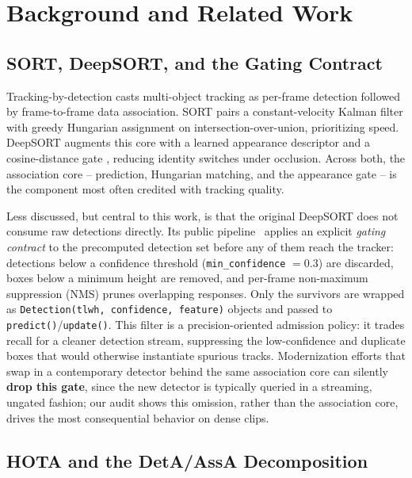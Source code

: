 \section{Background and Related Work}
\label{sec:related}

\subsection{SORT, DeepSORT, and the Gating Contract}

Tracking-by-detection casts multi-object tracking as per-frame detection followed by frame-to-frame data association. SORT \cite{bewley2016sort} pairs a constant-velocity Kalman filter with greedy Hungarian assignment on intersection-over-union, prioritizing speed. DeepSORT \cite{wojke2017deepsort} augments this core with a learned appearance descriptor and a cosine-distance gate \cite{wojke2018cosine}, reducing identity switches under occlusion. Across both, the association core -- prediction, Hungarian matching, and the appearance gate -- is the component most often credited with tracking quality.

Less discussed, but central to this work, is that the original DeepSORT does not consume raw detections directly. Its public pipeline~\cite{wojke2017deepsortcode} applies an explicit \emph{gating contract} to the precomputed detection set before any of them reach the tracker: detections below a confidence threshold (\texttt{min\_confidence} $=0.3$) are discarded, boxes below a minimum height are removed, and per-frame non-maximum suppression (NMS) prunes overlapping responses. Only the survivors are wrapped as \texttt{Detection(tlwh, confidence, feature)} objects and passed to \texttt{predict()}/\texttt{update()}. This filter is a precision-oriented admission policy: it trades recall for a cleaner detection stream, suppressing the low-confidence and duplicate boxes that would otherwise instantiate spurious tracks. Modernization efforts that swap in a contemporary detector behind the same association core can silently \textbf{drop this gate}, since the new detector is typically queried in a streaming, ungated fashion; our audit shows this omission, rather than the association core, drives the most consequential behavior on dense clips.

\subsection{HOTA and the DetA/AssA Decomposition}

